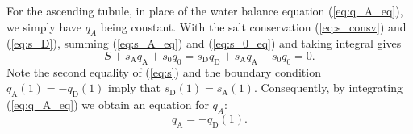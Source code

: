 \documentclass{article}
\numberwithin{equation}{section} %
\begin{document}
For the ascending tubule, in place of the water balance equation (\ref{eq:q_A_eq}), we simply have $q_A$ being constant.
With the salt conservation (\ref{eq:s_consv}) and (\ref{eq:s_D}), summing (\ref{eq:s_A_eq}) and (\ref{eq:s_0_eq}) and taking integral gives
\begin{equation}\label{eq:s}
    S+s_\mathrm{A}q_\mathrm{A}+s_0q_0 = s_\mathrm{D}q_\mathrm{D}+s_\mathrm{A}q_\mathrm{A}+s_0q_0 = 0.
\end{equation}
Note the second equality of (\ref{eq:s}) and the boundary condition $q_\mathrm{A}(1) = -q_\mathrm{D}(1)$ imply that $s_\mathrm{D}(1) = s_\mathrm{A}(1)$.
Consequently, by integrating (\ref{eq:q_A_eq}) we obtain an equation for $q_A$:
\begin{equation}\label{eq:q_A}
    q_\mathrm{A} = -q_\mathrm{D}(1).
\end{equation}
\end{document}
